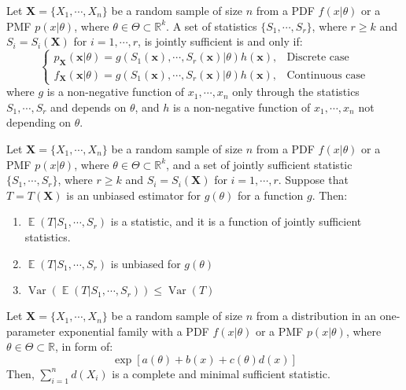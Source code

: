 \documentclass{huhtakm-template-book-v2}
\DeclareMathOperator{\E}{\mathbb{E}}
\DeclareMathOperator{\Var}{Var}
\begin{document}
\begin{thm}
	Let $\mathbf{X}=\{X_{1},\cdots,X_{n}\}$ be a random sample of size $n$ from a PDF $f(x|\theta)$ or a PMF $p(x|\theta)$, where $\theta\in\Theta\subset\mathbb{R}^{k}$. A set of statistics $\{S_{1},\cdots,S_{r}\}$, where $r\geq k$ and $S_{i}=S_{i}(\mathbf{X})$ for $i=1,\cdots,r$, is jointly sufficient is and only if:
	\begin{equation*}
		\begin{cases}
			p_{\mathbf{X}}(\mathbf{x}|\theta)=g(S_{1}(\mathbf{x}),\cdots,S_{r}(\mathbf{x})|\theta)h(\mathbf{x}), &\text{Discrete case}\\
			f_{\mathbf{X}}(\mathbf{x}|\theta)=g(S_{1}(\mathbf{x}),\cdots,S_{r}(\mathbf{x})|\theta)h(\mathbf{x}), &\text{Continuous case}
		\end{cases}
	\end{equation*}
	where $g$ is a non-negative function of $x_{1},\cdots,x_{n}$ only through the statistics $S_{1},\cdots,S_{r}$ and depends on $\theta$, and $h$ is a non-negative function of $x_{1},\cdots,x_{n}$ not depending on $\theta$.
\end{thm}
\begin{thm}
	Let $\mathbf{X}=\{X_{1},\cdots,X_{n}\}$ be a random sample of size $n$ from a PDF $f(x|\theta)$ or a PMF $p(x|\theta)$, where $\theta\in\Theta\subset\mathbb{R}^{k}$, and a set of jointly sufficient statistic $\{S_{1},\cdots,S_{r}\}$, where $r\geq k$ and $S_{i}=S_{i}(\mathbf{X})$ for $i=1,\cdots,r$. Suppose that $T=T(\mathbf{X})$ is an unbiased estimator for $g(\theta)$ for a function $g$. Then:
	\begin{enumerate}
		\item $\E(T|S_{1},\cdots,S_{r})$ is a statistic, and it is a function of jointly sufficient statistics.
		\item $\E(T|S_{1},\cdots,S_{r})$ is unbiased for $g(\theta)$
		\item $\Var(\E(T|S_{1},\cdots,S_{r}))\leq\Var(T)$
	\end{enumerate}
\end{thm}
\begin{thm}
	Let $\mathbf{X}=\{X_{1},\cdots,X_{n}\}$ be a random sample of size $n$ from a distribution in an one-parameter exponential family with a PDF $f(x|\theta)$ or a PMF $p(x|\theta)$, where $\theta\in\Theta\subset\mathbb{R}$, in form of:
	\begin{equation*}
		\exp[a(\theta)+b(x)+c(\theta)d(x)]
	\end{equation*}
	Then, $\sum_{i=1}^{n}d(X_{i})$ is a complete and minimal sufficient statistic.
\end{thm}
\end{document}
